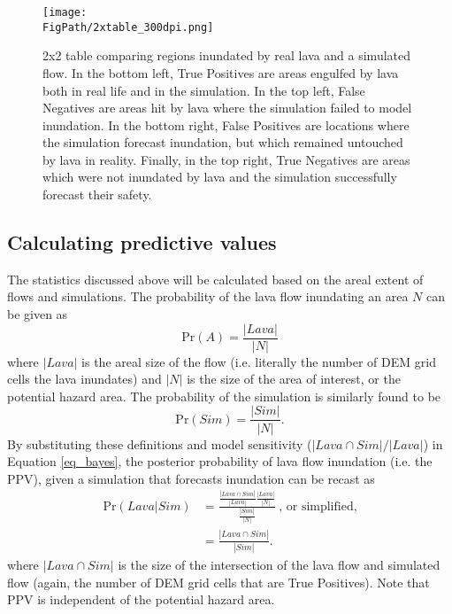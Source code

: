	
	\begin{figure}
		\centering
		\texttt{[image: \\FigPath/2xtable\_300dpi.png]}
		\caption[2x2 table comparing regions inundated by real lava and a simulated flow]{2x2 table comparing regions inundated by real lava and a simulated flow. In the bottom left, True Positives are areas engulfed by lava both in real life and in the simulation. In the top left, False Negatives are areas hit by lava where the simulation failed to model inundation. In the bottom right, False Positives are locations where the simulation forecast inundation, but which remained untouched by lava in reality. Finally, in the top right, True Negatives are areas which were not inundated by lava and the simulation successfully forecast their safety.}
		\label{fig_2x2ch}
	\end{figure}
	
		\subsection{Calculating predictive values} The statistics discussed above will be calculated based on the areal extent of flows and simulations. The probability of the lava flow inundating an area $N$ can be given as
		\begin{equation}
			\text{Pr}(A)=\frac{|Lava|}{|N|}\label{eq_PA}
		\end{equation}
		where $|Lava|$ is the areal size of the flow (i.e. literally the number of DEM grid cells the lava inundates) and $|N|$ is the size of the area of interest, or the potential hazard area. The probability of the simulation is similarly found to be
		\begin{equation}
			\text{Pr}(Sim)=\frac{|Sim|}{|N|}.\label{eq_PB}
		\end{equation}
		By substituting these definitions and model sensitivity ($|Lava \cap Sim|/|Lava|$) in Equation \ref{eq_bayes}, the posterior probability of lava flow inundation (i.e. the PPV), given a simulation that forecasts inundation can be recast as
		\begin{align}
		\text{Pr}(Lava|Sim)&=\frac{\frac{|Lava\cap Sim|}{|Lava|}\frac{|Lava|}{|N|}}{\frac{|Sim|}{|N|}}~\text{,~or~simplified,}\label{eq_unsimplepost}\\
		&=\frac{|Lava\cap Sim|}{|Sim|}.\label{eq_simplepost}
		\end{align}
		where $|Lava\cap Sim|$ is the size of the intersection of the lava flow and simulated flow (again, the number of DEM grid cells that are True Positives). Note that PPV is independent of the potential hazard area.
		

